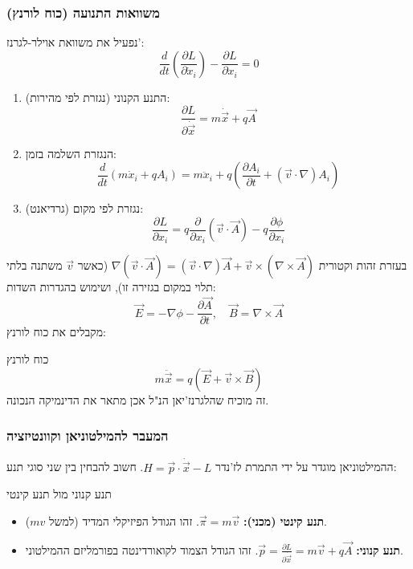\subsubsection{משוואות התנועה (כוח לורנץ)}
נפעיל את משוואת אוילר-לגרנז':
\begin{equation}
    \frac{d}{dt} \left( \frac{\partial L}{\partial \dot{x}_i} \right) - \frac{\partial L}{\partial x_i} = 0
\end{equation}
\begin{enumerate}
    \item התנע הקנוני (נגזרת לפי מהירות):
    \begin{equation}
        \frac{\partial L}{\partial \dot{\vec{x}}} = m\dot{\vec{x}} + q\vec{A}
    \end{equation}
    \item הנגזרת השלמה בזמן:
    \begin{equation}
        \frac{d}{dt}(m\dot{x}_i + qA_i) = m\ddot{x}_i + q\left(\frac{\partial A_i}{\partial t} + (\vec{v}\cdot\nabla)A_i\right)
    \end{equation}
    \item נגזרת לפי מקום (גרדיאנט):
    \begin{equation}
        \frac{\partial L}{\partial x_i} = q \frac{\partial}{\partial x_i} (\vec{v}\cdot\vec{A}) - q \frac{\partial \phi}{\partial x_i}
    \end{equation}
\end{enumerate}
בעזרת זהות וקטורית $\nabla(\vec{v}\cdot\vec{A}) = (\vec{v}\cdot\nabla)\vec{A} + \vec{v}\times(\nabla\times\vec{A})$ (כאשר $\vec{v}$ משתנה בלתי תלוי במקום בגזירה זו), ושימוש בהגדרות השדות:
\begin{equation}
    \vec{E} = -\nabla\phi - \frac{\partial \vec{A}}{\partial t}, \quad \vec{B} = \nabla \times \vec{A}
\end{equation}
מקבלים את כוח לורנץ:
\begin{resultbox}{כוח לורנץ}
\begin{equation}
    m\ddot{\vec{x}} = q(\vec{E} + \vec{v} \times \vec{B})
\end{equation}
זה מוכיח שהלגרנז'יאן הנ"ל אכן מתאר את הדינמיקה הנכונה.
\end{resultbox}

\subsubsection{המעבר להמילטוניאן וקוונטיזציה}
ההמילטוניאן מוגדר על ידי התמרת לז'נדר $H = \vec{p}\cdot\dot{\vec{x}} - L$.
חשוב להבחין בין שני סוגי תנע:
\begin{notebox}{תנע קנוני מול תנע קינטי}
\begin{itemize}
    \item \textbf{תנע קינטי (מכני):} $\vec{\pi} = m\vec{v}$. זהו הגודל הפיזיקלי המדיד (למשל $mv$).
    \item \textbf{תנע קנוני:} $\vec{p} = \frac{\partial L}{\partial \dot{\vec{x}}} = m\vec{v} + q\vec{A}$. זהו הגודל הצמוד לקואורדינטה בפורמליזם ההמילטוני.
\end{itemize}
\end{notebox}

